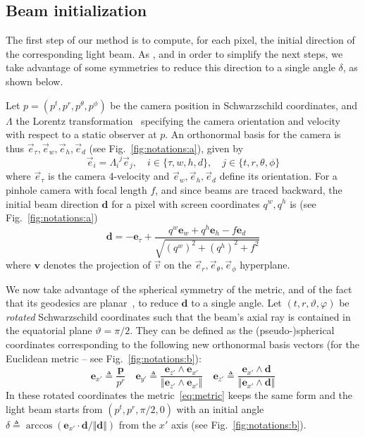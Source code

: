 \documentclass{document}
\begin{document}
\subsection{Beam initialization}

The first step of our method is to compute, for each pixel, the initial 
direction of the corresponding light beam. As \cite{Muller2010}, and in order 
to simplify the next steps, we take advantage of some symmetries to reduce this 
direction to a single angle $\delta$, as shown below.

Let $p=(p^t, p^r, p^\theta, p^\phi)$ be the camera position in Schwarzschild 
coordinates, and $\Lambda$ the Lorentz transformation~\cite{weinberg1972} 
specifying the camera orientation and velocity with respect to a static 
observer at $p$. An orthonormal basis for the camera is thus $\vec{e}_{\tau}, 
\vec{e}_w, \vec{e}_h, \vec{e}_d$ (see Fig.~\ref{fig:notations:a}), given by
\begin{equation}
\vec{e}_i = {\Lambda_i}^j \vec{e}_j, \quad i \in \{\tau, w, h, d\}, \quad j \in 
\{t, r, \theta, \phi\} \label{eq:camerabasis}
\end{equation}
where $\vec{e}_{\tau}$ is the camera 4-velocity and $\vec{e}_w, \vec{e}_h, 
\vec{e}_d$ define its orientation. For a pinhole camera with focal length $f$, 
and since beams are traced backward, the initial beam direction $\mathbf{d}$ 
for a pixel with screen coordinates $q^w, q^h$ is (see 
Fig.~\ref{fig:notations:a})
\begin{equation}
{\mathbf d} = -{\mathbf e}_{\tau} + \frac{q^w {\mathbf e}_w + 
	q^h {\mathbf e}_h - f {\mathbf e}_d}{\sqrt{(q^w)^2 + (q^h)^2 + f^2}}
\label{eq:d}
\end{equation}
where ${\mathbf v}$ denotes the projection of $\vec{v}$ on the $\vec{e}_r, 
\vec{e}_\theta, \vec{e}_\phi$ hyperplane.

We now take advantage of the spherical symmetry of the metric, and of the fact 
that its geodesics are planar~\cite{weinberg1972}, to reduce ${\mathbf d}$ to a 
single angle. Let $(t, r, \vartheta, \varphi)$ be {\em rotated} Schwarzschild 
coordinates such that the beam's axial ray is contained in the equatorial plane 
$\vartheta = \pi/2$. They can be defined as the (pseudo-)spherical coordinates
corresponding to the following new orthonormal basis vectors (for the Euclidean
metric -- see Fig.~\ref{fig:notations:b}):
\begin{equation}
{\mathbf e}_{x'} \triangleq \frac{{\mathbf p}}{p^r} \quad
{\mathbf e}_{y'} \triangleq 
    \frac{{\mathbf e}_{z'} \wedge {\mathbf e}_{x'}}
         {\Vert {\mathbf e}_{z'} \wedge {\mathbf e}_{x'} \Vert} \quad
{\mathbf e}_{z'} \triangleq 
    \frac{{\mathbf e}_{x'} \wedge {\mathbf d}}
         {\Vert {\mathbf e}_{x'} \wedge {\mathbf d} \Vert}
\label{eq:raybasis}
\end{equation}
In these rotated coordinates the metric~\eqref{eq:metric} keeps the same form 
and the light beam starts from $(p^t, p^r, \pi/2, 0)$ with an initial angle 
$\delta \triangleq \arccos({\mathbf e}_{x'} \cdot {\mathbf d} / \Vert {\mathbf 
d} \Vert)$ from the $x'$ axis (see Fig.~\ref{fig:notations:b}).
\end{document}
